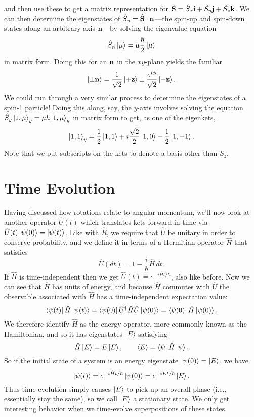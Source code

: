 \documentclass[../p116main.tex]{subfiles}
\begin{document}
and then use these to get a matrix representation for $\hat{\mathbf{S}} = \hat S_x \mathbf{i} + \hat S_y \mathbf{j} + \hat S_z \mathbf{k}$.
We can then determine the eigenstates of $\hat S_n = \hat{\mathbf{S}} \cdot \mathbf{n}$---the spin-up and spin-down states along an arbitrary axis $\mathbf{n}$---by solving the eigenvalue equation
\[ \hat S_n \left| \mu \right> = \mu \frac{\hbar}{2} \left| \mu \right> \]
in matrix form.
Doing this for an $\mathbf{n}$ in the $xy$-plane yields the familiar
\[ \left| \pm \mathbf{n} \right> = \frac{1}{\sqrt{2}} \left| +\mathbf{z} \right> \pm \frac{e^{i\phi}}{\sqrt{2}} \left| -\mathbf{z} \right>. \]
We could run through a very similar process to determine the eigenstates of a spin-1 particle!
Doing this along, say, the $y$-axis involves solving the equation $\hat S_y \left| 1, \mu \right>_y = \mu \hbar \left| 1,\mu \right>_y$ in matrix form to get, as one of the eigenkets,
\[ \left| 1,1 \right>_y = \frac{1}{2} \left| 1,1 \right> + i \frac{\sqrt{2}}{2} \left| 1,0 \right> - \frac{1}{2} \left| 1,-1 \right>. \]
Note that we put subscripts on the kets to denote a basis other than $S_z$.

\section{Time Evolution}
Having discussed how rotations relate to angular momentum, we'll now look at another operator $\hat U(t)$ which translates kets forward in time via $\hat U(t) \left| \psi(0) \right> = \left| \psi(t) \right>$.
Like with $\hat R$, we require that $\hat U$ be unitary in order to conserve probability, and we define it in terms of a Hermitian operator $\hat H$ that satisfies
\[ \hat U(dt) = 1 - \frac{i}{\hbar} \hat H \,dt. \]
If $\hat H$ is time-independent then we get $\hat U(t) = e^{-i \hat H t / \hbar}$, also like before.
Now we can see that $\hat H$ has units of energy, and because $\hat H$ commutes with $\hat U$ the observable associated with $\hat H$ has a time-independent expectation value:
\[ \left< \psi(t) \right| \hat H \left| \psi(t) \right> = \left< \psi(0) \right| \hat U^\dagger \hat H \hat U \left| \psi(0) \right> = \left< \psi(0) \right| \hat H \left| \psi(0) \right>. \]
We therefore identify $\hat H$ as the energy operator, more commonly known as the Hamiltonian, and so it has eigenstates $\left| E \right>$ satisfying
\[ \hat H \left| E \right> = E \left| E \right>, \qquad \langle E \rangle = \left< \psi \right| \hat H \left| \psi \right>. \]
So if the initial state of a system is an energy eigenstate $\left| \psi(0) \right> = \left| E \right>$, we have
\[ \left| \psi(t) \right> = e^{-i\hat H t / \hbar} \left| \psi(0) \right> = e^{-iEt / \hbar} \left| E \right>. \]
Thus time evolution simply causes $\left| E \right>$ to pick up an overall phase (i.e., essentially stay the same), so we call $\left| E \right>$ a stationary state.
We only get interesting behavior when we time-evolve superpositions of these states.
\end{document}

